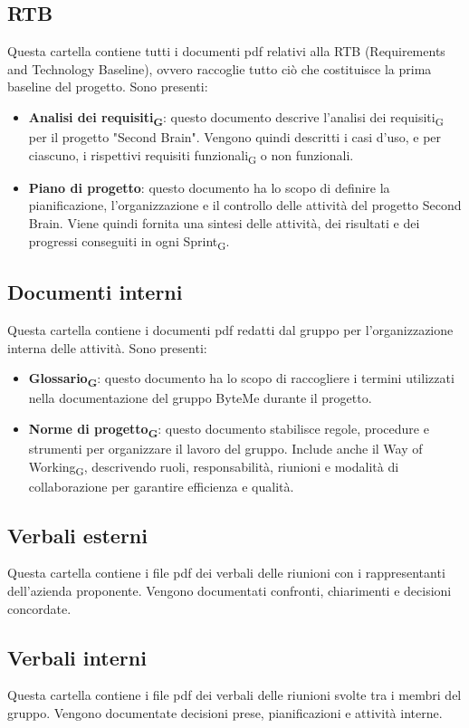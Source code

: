 \documentclass[11pt,a4paper]{article}
\newcommand{\gls}[1]{#1\textsubscript{G}}
\begin{document}
\subsection{RTB}
Questa cartella contiene tutti i documenti pdf relativi alla RTB (Requirements and Technology Baseline), ovvero raccoglie tutto ciò che costituisce la prima baseline del progetto. Sono presenti:
\begin{itemize}
\item \textbf{\gls{Analisi dei requisiti}}: questo documento descrive l'\gls{analisi dei requisiti} per il progetto "Second Brain". Vengono quindi descritti i casi d'uso, e per ciascuno, i rispettivi \gls{requisiti funzionali} o non funzionali.
\item \textbf{Piano di progetto}: questo documento ha lo scopo di definire la pianificazione, l’organizzazione e il controllo delle attività del progetto Second Brain. Viene quindi fornita una sintesi delle attività, dei risultati e dei progressi conseguiti in ogni \gls{Sprint}.
\end{itemize}

\subsection{Documenti interni}
Questa cartella contiene i documenti pdf redatti dal gruppo per l’organizzazione interna delle attività. Sono presenti:
\begin{itemize}
\item \textbf{\gls{Glossario}}: questo documento ha lo scopo di raccogliere i termini utilizzati nella documentazione del gruppo ByteMe durante il progetto.
\item \textbf{\gls{Norme di progetto}}: questo documento stabilisce regole, procedure e strumenti per organizzare il lavoro del gruppo. Include anche il \gls{Way of Working}, descrivendo ruoli, responsabilità, riunioni e modalità di collaborazione per garantire efficienza e qualità.
\end{itemize}

\subsection{Verbali esterni}
Questa cartella contiene i file pdf dei verbali delle riunioni con i rappresentanti dell'azienda proponente. Vengono documentati confronti, chiarimenti e decisioni concordate.

\subsection{Verbali interni}
Questa cartella contiene i file pdf dei verbali delle riunioni svolte tra i membri del gruppo. Vengono documentate decisioni prese, pianificazioni e attività interne.
\end{document}
